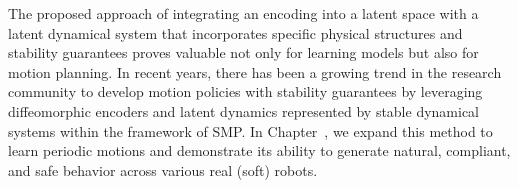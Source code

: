 The proposed approach of integrating an encoding into a latent space with a latent dynamical system that incorporates specific physical structures and stability guarantees proves valuable not only for learning models but also for motion planning. In recent years, there has been a growing trend in the research community to develop motion policies with stability guarantees by leveraging diffeomorphic encoders and latent dynamics represented by stable dynamical systems within the framework of \gls{SMP}\cite{rana2020euclideanizing, perez2023stable, zhi2024teaching}. In Chapter~\circled{\ref{chp:osmp}}, we expand this method to learn periodic motions and demonstrate its ability to generate natural, compliant, and safe behavior across various real (soft) robots.

